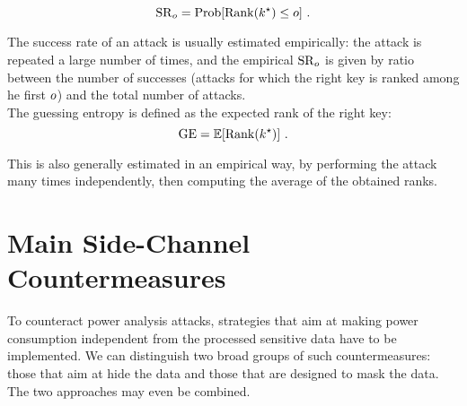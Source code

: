 \begin{equation}
\mathrm{SR}_o = \mathrm{Prob}[\mathrm{Rank}(k^\star)\leq o] \mbox{ .}
\end{equation}

The success rate of an attack is usually estimated empirically: the attack is repeated a large number of times, and the empirical $\mathrm{SR}_o$ is given by ratio between the number of successes (attacks for which the right key is ranked among he first $o$) and the total number of attacks. \\

The guessing entropy \cite{massey1994guessing} is defined as the expected rank of the right key: 
\begin{equation}
\mathrm{GE} = \mathbb{E}[\mathrm{Rank}(k^\star)]\mbox{ .}
\end{equation}

This is also generally estimated in an empirical way, by performing the attack many times independently, then computing the average of the obtained ranks. 

\section{Main Side-Channel Countermeasures}\label{sec:countermeasures}
To counteract power analysis attacks, strategies that aim at making power consumption independent from the processed sensitive data have to be implemented. We can distinguish two broad groups of such countermeasures: 
those that aim at hide the data and those that are designed to mask the data. The two approaches may even be combined.

